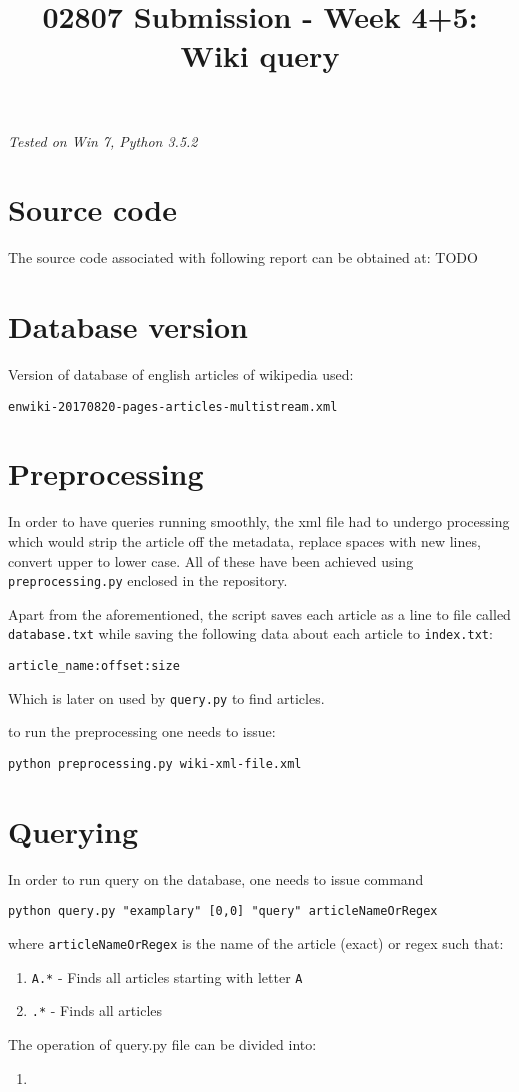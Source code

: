 \documentclass[12pt]{article}
\title{02807 Submission - Week 4+5: Wiki query}
\begin{document}
\begin{center}
    \textit{Tested on Win 7, Python 3.5.2}
\end{center}
\section*{Source code}
The source code associated with following report can be obtained at: TODO
\section*{Database version}
Version of database of english articles of wikipedia used:

\texttt{enwiki-20170820-pages-articles-multistream.xml}
\section*{Preprocessing}
In order to have queries running smoothly, the xml file had to undergo processing which would strip the article off the metadata, replace spaces with new lines, 
convert upper to lower case. All of these have been achieved using \texttt{preprocessing.py} enclosed in the repository.

Apart from the aforementioned, the script saves each article as a line to file called \texttt{database.txt} while saving the following data about each article to \texttt{index.txt}:

\texttt{article\_name:offset:size}

Which is later on used by \texttt{query.py} to find articles.

to run the preprocessing one needs to issue:
\begin{verbatim}
python preprocessing.py wiki-xml-file.xml
\end{verbatim}

\section*{Querying}
In order to run query on the database, one needs to issue command
\begin{verbatim}
python query.py "examplary" [0,0] "query" articleNameOrRegex
\end{verbatim}
where \texttt{articleNameOrRegex} is the name of the article (exact) or regex such that:
\begin{enumerate}
    \item \texttt{A.*} - Finds all articles starting with letter \texttt{A}
    \item \texttt{.*} - Finds all articles
\end{enumerate}

The operation of query.py file can be divided into:
\begin{enumerate}
    \item 
\end{enumerate}
\end{document}
